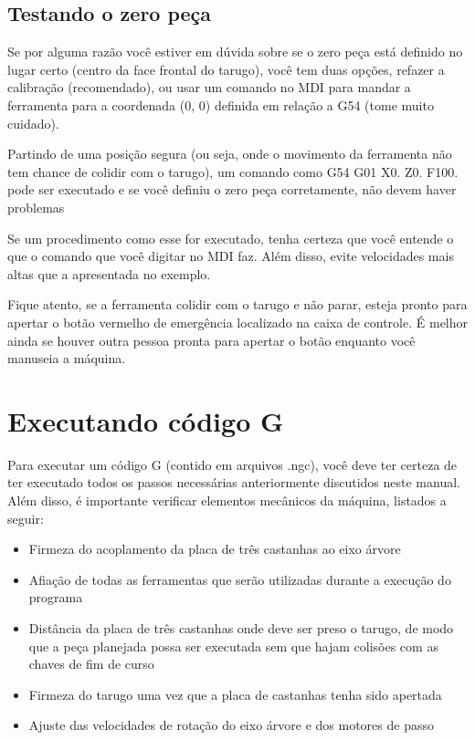 \documentclass[twoside,a4paper]{refart}
\begin{document}
\subsection{Testando o zero peça}

Se por alguma razão você estiver em dúvida sobre se o zero peça está definido no lugar certo (centro da face frontal do tarugo), você tem duas opções, refazer a calibração (recomendado), ou usar um comando no MDI para mandar a ferramenta para a coordenada (0, 0) definida em relação a G54 (tome muito cuidado).

Partindo de uma posição segura (ou seja, onde o movimento da ferramenta não tem chance de colidir com o tarugo), um comando como G54 G01 X0. Z0. F100. pode ser executado e se você definiu o zero peça corretamente, não devem haver problemas

\attention Se um procedimento como esse for executado, tenha certeza que você entende o que o comando que você digitar no MDI faz. Além disso, evite velocidades mais altas que a apresentada no exemplo.

\attention Fique atento, se a ferramenta colidir com o tarugo e não parar, esteja pronto para apertar o botão vermelho de emergência localizado na caixa de controle. É melhor ainda se houver outra pessoa pronta para apertar o botão enquanto você manuseia a máquina. 

\section{Executando código G}

Para executar um código G (contido em arquivos .ngc), você deve ter certeza de ter executado todos os passos necessárias anteriormente discutidos neste manual. Além disso, é importante verificar elementos mecânicos da máquina, listados a seguir:

\begin{itemize}
    \item Firmeza do acoplamento da placa de três castanhas ao eixo árvore 
    \item Afiação de todas as ferramentas que serão utilizadas durante a execução do programa 
    \item Distância da placa de três castanhas onde deve ser preso o tarugo, de modo que a peça planejada possa ser executada sem que hajam colisões com as chaves de fim de curso
    \item Firmeza do tarugo uma vez que a placa de castanhas tenha sido apertada
    \item Ajuste das velocidades de rotação do eixo árvore e dos motores de passo
\end{itemize}
\end{document}
